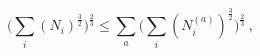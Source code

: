 \begin{equation}
\biggl(\sum_i(N_i)^{\frac{3}{2}}\biggr)^{\frac{2}{3}}
\leq
\sum_a\biggl(\sum_i(N_i^{(a)})^{\frac{3}{2}}\biggr)^{\frac{2}{3}}~,
\label{minkowskii.eqn2}
\end{equation}

